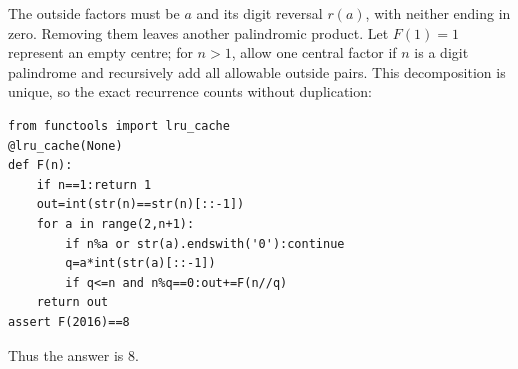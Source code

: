 The outside factors must be $ a $ and its digit reversal $ r(a)$, with neither ending in zero. Removing them leaves another palindromic product. Let $ F(1)=1 $ represent an empty centre; for $ n>1 $, allow one central factor if $ n $ is a digit palindrome and recursively add all allowable outside pairs. This decomposition is unique, so the exact recurrence counts without duplication:
\begin{verbatim}
from functools import lru_cache
@lru_cache(None)
def F(n):
    if n==1:return 1
    out=int(str(n)==str(n)[::-1])
    for a in range(2,n+1):
        if n%a or str(a).endswith('0'):continue
        q=a*int(str(a)[::-1])
        if q<=n and n%q==0:out+=F(n//q)
    return out
assert F(2016)==8
\end{verbatim}
Thus the answer is $\boxed8 $.
